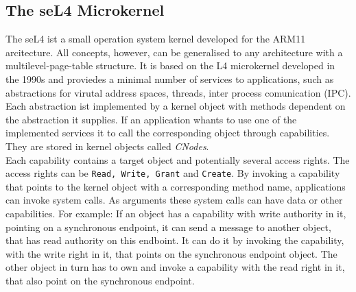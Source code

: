 \subsection{The seL4 Microkernel}\label{sec:seL4}
	The seL4 \cite{Manual} ist a small operation system kernel developed for the ARM11 arcitecture. All concepts, however, can be generalised to any architecture with a multilevel-page-table structure. \cite{PhDseL4} It is based on the L4 microkernel developed in the 1990s and proviedes a minimal number of services to applications, such as abstractions for virutal address spaces, threads, inter process comunication (IPC). \\
	Each abstraction ist implemented by a kernel object with methods dependent on the abstraction it supplies. If an application whants to use one of the implemented services it to call the corresponding object through capabilities. They are stored in kernel objects called \textit{CNodes}. \\
	Each capability contains a target object and potentially several access rights. The access rights can be \texttt{Read, Write, Grant} and \texttt{Create}. By invoking a capability that points to the kernel object  with a corresponding method name, applications can invoke system calls. As arguments these system calls can have data or other capabilities. For example: If an object has a capability with write authority in it, pointing on a synchronous endpoint, it can send a message to another object, that has read authority on this endboint. It can do it by invoking the capability, with the write right in it, that points on the synchronous endpoint object. The other object in turn has to own and invoke a capability with the read right in it, that also point on the synchronous endpoint.

